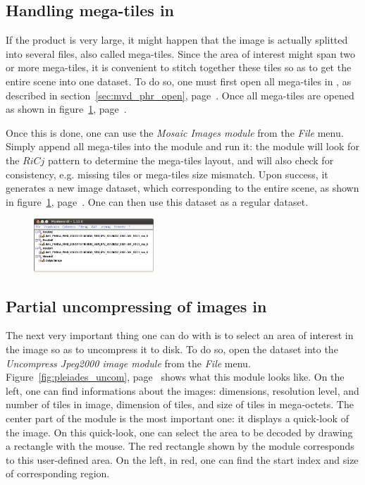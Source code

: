 \subsection{Handling mega-tiles in \mont}

If the \phr product is very large, it might happen that the image is
actually splitted into several \jpg files, also called
mega-tiles. Since the area of interest might span two or more
mega-tiles, it is convenient to stitch together these tiles so as to
get the entire scene into one \mont dataset. To do so, one must first
open all mega-tiles in \mont, as described in
section~\ref{sec:mvd_phr_open}, page~\pageref{sec:mvd_phr_open}. Once
all mega-tiles are opened as shown in
figure~\ref{fig:pleiades_mtiles_open},
page~\pageref{fig:pleiades_mtiles_open}.

Once this is done, one can use the \textit{Mosaic Images module} from
the \textit{File} menu. Simply append all mega-tiles into the module
and run it: the module will look for the $RiCj$ pattern to determine
the mega-tiles layout, and will also check for consistency,
e.g. missing tiles or mega-tiles size mismatch. Upon success, it
generates a new \phr image dataset, which corresponding to the entire
scene, as shown in figure~\ref{fig:pleiades_mtiles_open},
page~\pageref{fig:pleiades_mtiles_open}. One can then use this dataset
as a regular \phr dataset.

\begin{figure}[!t]
  \center
  \includegraphics[width=0.4\textwidth]{../Art/MonteverdiImages/pleiades_mtiles_open.png}
  \label{fig:pleiades_mtiles_open}
\end{figure}

\subsection{Partial uncompressing of \phr images in \mont}

The next very important thing one can do with \mont is to select an
area of interest in the \phr image so as to uncompress it to disk. To
do so, open the \phr dataset into the \textit{Uncompress Jpeg2000
image module} from the \textit{File}
menu. Figure~\ref{fig:pleiades_uncom},
page~\pageref{fig:pleiades_uncom} shows what this module looks
like. On the left, one can find informations about the images:
dimensions, resolution level, and number of \jpg tiles in image,
dimension of tiles, and size of tiles in mega-octets. The center part
of the module is the most important one: it displays a quick-look of
the \phr image. On this quick-look, one can select the area to be
decoded by drawing a rectangle with the mouse. The red rectangle shown
by the module corresponds to this user-defined area. On the left, in
red, one can find the start index and size of corresponding region.

